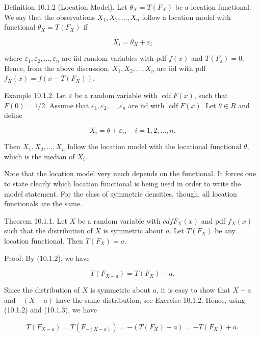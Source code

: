 Definition 10.1.2 (Location Model). Let $\theta_{X}=T\left(F_{X}\right)$ be a location functional. We say that the observations $X_{1}, X_{2}, \ldots, X_{n}$ follow a location model with functional $\theta_{X}=T\left(F_{X}\right)$ if


\begin{equation*}
X_{i}=\theta_{X}+\varepsilon_{i} \tag{10.1.4}
\end{equation*}


where $\varepsilon_{1}, \varepsilon_{2}, \ldots, \varepsilon_{n}$ are iid random variables with pdf $f(x)$ and $T\left(F_{\varepsilon}\right)=0$. Hence, from the above discussion, $X_{1}, X_{2}, \ldots, X_{n}$ are iid with pdf $f_{X}(x)=f\left(x-T\left(F_{X}\right)\right)$.

Example 10.1.2. Let $\varepsilon$ be a random variable with $\operatorname{cdf} F(x)$, such that $F(0)=1 / 2$. Assume that $\varepsilon_{1}, \varepsilon_{2}, \ldots, \varepsilon_{n}$ are iid with $\operatorname{cdf} F(x)$. Let $\theta \in R$ and define

$$
X_{i}=\theta+\varepsilon_{i}, \quad i=1,2, \ldots, n .
$$

Then $X_{1}, X_{2}, \ldots, X_{n}$ follow the location model with the locational functional $\theta$, which is the median of $X_{i}$.

Note that the location model very much depends on the functional. It forces one to state clearly which location functional is being used in order to write the model statement. For the class of symmetric densities, though, all location functionals are the same.

Theorem 10.1.1. Let $X$ be a random variable with $c d f F_{X}(x)$ and pdf $f_{X}(x)$ such that the distribution of $X$ is symmetric about $a$. Let $T\left(F_{X}\right)$ be any location functional. Then $T\left(F_{X}\right)=a$.

Proof: By (10.1.2), we have


\begin{equation*}
T\left(F_{X-a}\right)=T\left(F_{X}\right)-a . \tag{10.1.5}
\end{equation*}


Since the distribution of $X$ is symmetric about $a$, it is easy to show that $X-a$ and - $(X-a)$ have the same distribution; see Exercise 10.1.2. Hence, using (10.1.2) and (10.1.3), we have


\begin{equation*}
T\left(F_{X-a}\right)=T\left(F_{-(X-a)}\right)=-\left(T\left(F_{X}\right)-a\right)=-T\left(F_{X}\right)+a . \tag{10.1.6}
\end{equation*}


